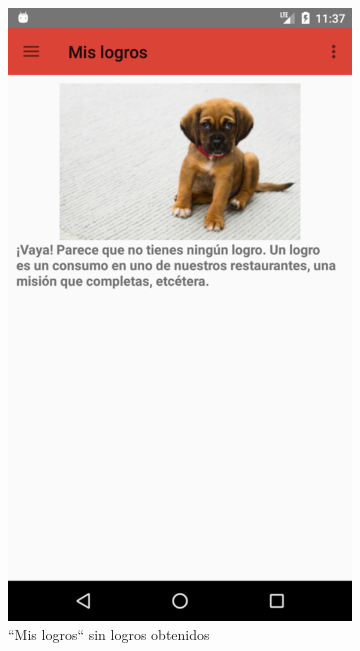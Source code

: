 \documentclass[twoside]{report}
\begin{document}
\begin{figure}[H]
\begin{center}
	\begin{subfigure}[t]{.3\linewidth}
		\includegraphics[scale=0.25]{images/userguide/5.png}
		\caption{“Mis logros“ sin logros obtenidos}
	\end{subfigure}\hspace{5mm}%
	\begin{subfigure}[t]{.3\linewidth} 

\end{subfigure}
\end{center}
\end{figure}
\end{document}

